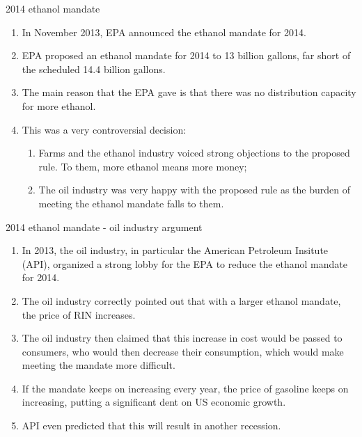 \documentclass[table,xcolor=pdftex,dvipsnames]{beamer}\usepackage[]{graphicx}\usepackage[]{color}
\begin{document}

\begin{frame}{2014 ethanol mandate}
\begin{enumerate}[label=\textbullet]
    \item In November 2013, EPA announced the ethanol mandate for 2014.
    \item EPA proposed an ethanol mandate for 2014 to 13 billion gallons, far short of the scheduled 14.4 billion gallons.
    \item The main reason that the EPA gave is that there was no distribution capacity for more ethanol.
    \item This was a very controversial decision:
      \begin{enumerate}[label=-]
          \item Farms and the ethanol industry voiced strong objections to the proposed rule. To them, more ethanol means more money;
          \item The oil industry was very happy with the proposed rule as the burden of meeting the ethanol mandate falls to them.
      \end{enumerate}
\end{enumerate}
\end{frame}


\begin{frame}{2014 ethanol mandate -  oil industry argument}
\begin{enumerate}[label=\textbullet]
    \item In 2013, the oil industry, in particular the American Petroleum Insitute (API), organized a strong lobby for the EPA to reduce the ethanol mandate for 2014.
    \item The oil industry correctly pointed out that with a larger ethanol mandate, the price of RIN increases.
    \item The oil industry then claimed that this increase in cost would be passed to consumers, who would then decrease their consumption, which would make meeting the mandate more difficult.
    \item If the mandate keeps on increasing every year, the price of gasoline keeps on increasing, putting a significant dent on US economic growth.
    \item API even predicted that this will result in another recession.
\end{enumerate}
\end{frame}
\end{document}
